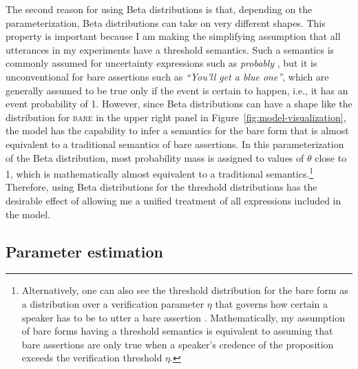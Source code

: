 The second reason for using Beta distributions is that, depending on the parameterization, 
Beta distributions can take on very different shapes. This property is important because I am making
the simplifying assumption that all utterances in my experiments have a threshold semantics.
Such a semantics is commonly assumed for uncertainty expressions such as \textit{probably} , 
but it is unconventional for bare assertions such as \textit{``You'll get a blue one''}, which are generally assumed to be  
true only if the event is certain to happen, i.e., it has an event probability of 1. However, since Beta distributions can have a shape 
like the distribution for \textsc{bare} in the upper right panel in Figure~\ref{fig:model-visualization}, the model has the capability to infer
a semantics for the bare form that is almost equivalent to a traditional semantics of bare assertions. In this parameterization of the
Beta distribution, most probability mass is assigned to values of $\theta$ close to 1, which is mathematically almost equivalent to
a traditional semantics.\footnote{Alternatively, one can also see the threshold distribution for the bare form as a distribution over a verification parameter $\eta$ that governs 
how certain a speaker has to be to utter a bare assertion \parencite[see, e.g.,][]{Lewis1976,Potts2007,Davis2007,Moss2018}. Mathematically, my assumption of bare forms having a threshold
semantics is equivalent to assuming that bare assertions are only true when a speaker's credence of the proposition exceeds the verification threshold $\eta$.}
Therefore, using Beta distributions for the threshold distributions has the desirable effect of allowing me a unified treatment of all expressions included in the model. 

\subsection{Parameter estimation}

